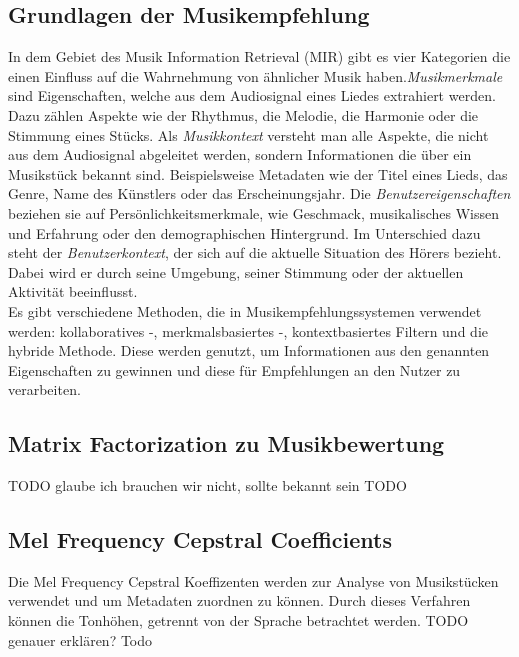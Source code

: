 \documentclass[twosided,a4,10pt]{article}
\begin{document}
\begin{multicols}{2}
		\section{Grundlagen der Musikempfehlung}
		In dem Gebiet des Musik Information Retrieval (MIR) gibt es vier Kategorien \cite{schedl} die einen Einfluss auf die Wahrnehmung von ähnlicher Musik haben.\newline \textit{Musikmerkmale} sind Eigenschaften, welche aus dem Audiosignal eines Liedes extrahiert werden. Dazu zählen Aspekte wie der Rhythmus, die Melodie, die Harmonie oder die Stimmung eines Stücks.\newline
		Als \textit{Musikkontext} versteht man alle Aspekte, die nicht aus dem Audiosignal abgeleitet werden, sondern Informationen die über ein Musikstück bekannt sind. Beispielsweise Metadaten wie der Titel eines Lieds, das Genre, Name des Künstlers oder das Erscheinungsjahr.\newline
		Die \textit{Benutzereigenschaften} beziehen sie auf Persönlichkeitsmerkmale, wie Geschmack, musikalisches Wissen und Erfahrung oder den demographischen Hintergrund.\newline
		Im Unterschied dazu steht der \textit{Benutzerkontext}, der sich auf die aktuelle Situation des Hörers bezieht. Dabei wird er durch seine Umgebung, seiner Stimmung oder der aktuellen Aktivität beeinflusst. \cite{knees}\newline\\
		Es gibt verschiedene Methoden, die in Musikempfehlungssystemen verwendet werden: kollaboratives -, merkmalsbasiertes -, kontextbasiertes Filtern und die hybride Methode. Diese werden genutzt, um Informationen aus den genannten Eigenschaften zu gewinnen und diese für Empfehlungen an den Nutzer zu verarbeiten. \cite{wang}
		\subsection{Matrix Factorization zu Musikbewertung}
		TODO glaube ich brauchen wir nicht, sollte bekannt sein TODO
		\subsection{Mel Frequency Cepstral Coefficients}
		Die Mel Frequency Cepstral Koeffizenten werden zur Analyse von Musikstücken verwendet und um Metadaten zuordnen zu können. Durch dieses Verfahren können die Tonhöhen, getrennt von der Sprache betrachtet werden. TODO genauer erklären? Todo

\end{multicols}
\end{document}
